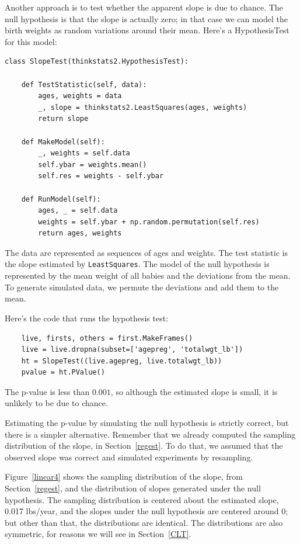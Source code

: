 \documentclass[12pt]{book}
\begin{document}
Another approach is to test whether the apparent slope is due to chance.
The null hypothesis is that the slope is actually zero; in that case
we can model the birth weights as random variations around their mean.
Here's a HypothesisTest for this model:

\begin{verbatim}
class SlopeTest(thinkstats2.HypothesisTest):

    def TestStatistic(self, data):
        ages, weights = data
        _, slope = thinkstats2.LeastSquares(ages, weights)
        return slope

    def MakeModel(self):
        _, weights = self.data
        self.ybar = weights.mean()
        self.res = weights - self.ybar

    def RunModel(self):
        ages, _ = self.data
        weights = self.ybar + np.random.permutation(self.res)
        return ages, weights
\end{verbatim}

The data are represented as sequences of ages and weights.  The
test statistic is the slope estimated by \verb"LeastSquares".
The model of the null hypothesis is represented by the mean weight
of all babies and the deviations from the mean.  To
generate simulated data, we permute the deviations and add them to
the mean.

Here's the code that runs the hypothesis test:

\begin{verbatim}
    live, firsts, others = first.MakeFrames()
    live = live.dropna(subset=['agepreg', 'totalwgt_lb'])
    ht = SlopeTest((live.agepreg, live.totalwgt_lb))
    pvalue = ht.PValue()
\end{verbatim}

The p-value is less than $0.001$, so although the estimated
slope is small, it is unlikely to be due to chance.

Estimating the p-value by simulating the null hypothesis is strictly
correct, but there is a simpler alternative.  Remember that we already
computed the sampling distribution of the slope, in
Section~\ref{regest}.  To do that, we assumed that the observed slope
was correct and simulated experiments by resampling.

Figure~\ref{linear4} shows the sampling distribution of the
slope, from Section~\ref{regest}, and the distribution of slopes
generated under the null hypothesis.  The sampling distribution
is centered about the estimated slope, 0.017 lbs/year, and the slopes
under the null hypothesis are centered around 0; but other than
that, the distributions are identical.  The distributions are
also symmetric, for reasons we will see in Section~\ref{CLT}.
\end{document}
